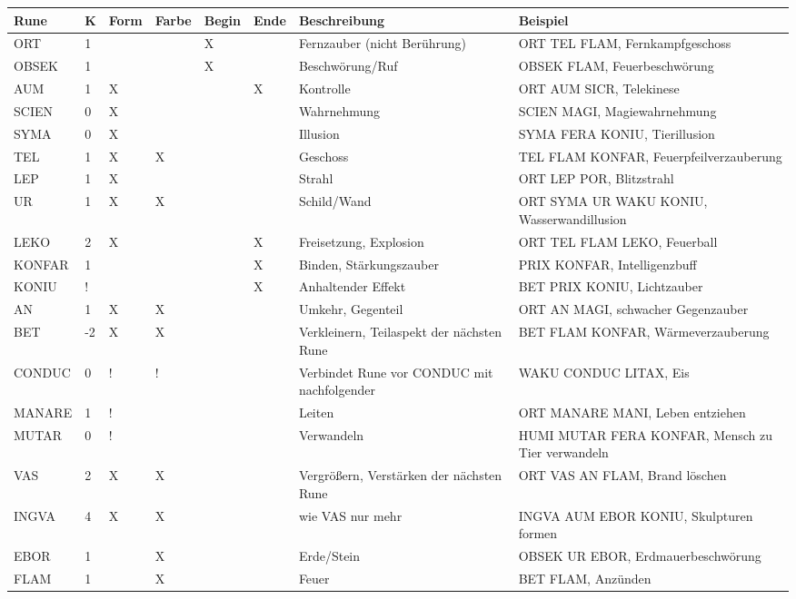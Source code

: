 \documentclass{article}
\begin{document}
\begin{footnotesize}
\begin{tabular}{|m{1.7cm}|m{0.3cm}|m{1cm}|m{1cm}|m{1cm}|m{1cm}|m{3cm}|m{5cm}|}
\hline
\textbf{Rune}&\textbf{K}&\textbf{Form}&\textbf{Farbe}&\textbf{Begin}&\textbf{Ende}&\textbf{Beschreibung}&\textbf{Beispiel}\\
\hline
\hline
ORT&1&&&X&&Fernzauber (nicht Berührung)&ORT TEL FLAM, Fernkampfgeschoss\\
\hline
OBSEK&1&&&X&&Beschwörung/Ruf&OBSEK FLAM, Feuerbeschwörung\\
\hline
\hline
AUM&1&X&&&X&Kontrolle&ORT AUM SICR, Telekinese\\
\hline
SCIEN&0&X&&&&Wahrnehmung&SCIEN MAGI, Magiewahrnehmung\\
\hline
SYMA&0&X&&&&Illusion&SYMA FERA KONIU, Tierillusion\\
\hline
TEL&1&X&X&&&Geschoss&TEL FLAM KONFAR, Feuerpfeilverzauberung\\
\hline
LEP&1&X&&&&Strahl&ORT LEP POR, Blitzstrahl\\
\hline
UR&1&X&X&&&Schild/Wand&ORT SYMA UR WAKU KONIU, Wasserwandillusion\\
\hline
LEKO&2&X&&&X&Freisetzung, Explosion&ORT TEL FLAM LEKO, Feuerball\\
\hline
\hline
KONFAR&1&&&&X&Binden, Stärkungszauber&PRIX KONFAR, Intelligenzbuff\\
\hline
KONIU&!&&&&X&Anhaltender Effekt&BET PRIX KONIU, Lichtzauber\\
\hline
\hline
AN&1&X&X&&&Umkehr, Gegenteil&ORT AN MAGI, schwacher Gegenzauber\\
\hline
BET&-2&X&X&&&Verkleinern, Teilaspekt der nächsten Rune&BET FLAM KONFAR, Wärmeverzauberung\\
\hline
CONDUC&0&!&!&&&Verbindet Rune vor CONDUC mit nachfolgender&WAKU CONDUC LITAX, Eis\\
\hline
MANARE&1&!&&&&Leiten&ORT MANARE MANI, Leben entziehen\\
\hline
MUTAR&0&!&&&&Verwandeln&HUMI MUTAR FERA KONFAR, Mensch zu Tier verwandeln\\
\hline
VAS&2&X&X&&&Vergrößern, Verstärken der nächsten Rune&ORT VAS AN FLAM, Brand löschen\\
\hline
INGVA&4&X&X&&&wie VAS nur mehr&INGVA AUM EBOR KONIU, Skulpturen formen\\
\hline
\hline
EBOR&1&&X&&&Erde/Stein&OBSEK UR EBOR, Erdmauerbeschwörung\\
\hline
FLAM&1&&X&&&Feuer&BET FLAM, Anzünden\\

\end{tabular}
\end{footnotesize}
\end{document}

